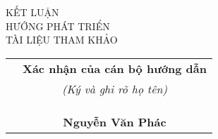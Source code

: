\documentclass[11pt,a4paper]{article}
\begin{document}
    \noindent 
    \vspace{5pt}KẾT LUẬN\\\vspace{5pt}HƯỚNG PHÁT TRIỂN\\\vspace{5pt}TÀI LIỆU THAM KHẢO
    
    \vspace{1cm}
    \fontsize{12}{0} 
    \begin{tabular}{ m{8cm} c }
        & \textbf{Xác nhận của cán bộ hướng dẫn}\\
        & \textit{(Ký và ghi rõ họ tên)}\\
        &\\ &\\ &\\ 
        & \textbf{Nguyễn Văn Phác}
    \end{tabular}
\end{document}
